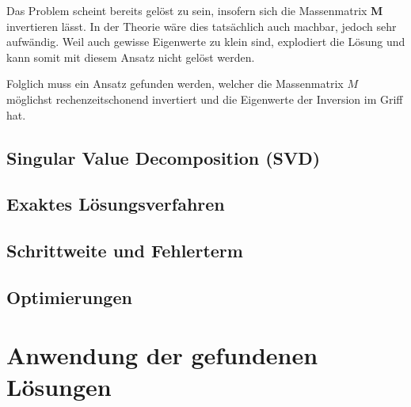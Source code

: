 \begin{refsection}
Das Problem scheint bereits gelöst zu sein, insofern sich die Massenmatrix \textbf{M} invertieren lässt. In der Theorie wäre dies tatsächlich auch machbar, jedoch sehr aufwändig. Weil auch gewisse Eigenwerte zu klein sind, explodiert die Lösung und kann somit mit diesem Ansatz nicht gelöst werden.

Folglich muss ein Ansatz gefunden werden, welcher die Massenmatrix $M$ möglichst rechenzeitschonend invertiert und die Eigenwerte der Inversion im Griff hat. 


\subsection{Singular Value Decomposition (SVD) }

\subsection{Exaktes Lösungsverfahren}

\subsection{Schrittweite und Fehlerterm}

\subsection{Optimierungen}

\section{Anwendung der gefundenen Lösungen}

\printbibliography[heading=subbibliography]
\end{refsection}
